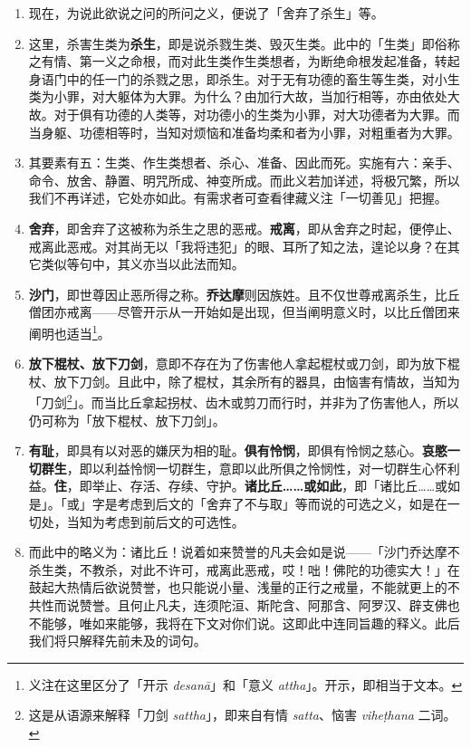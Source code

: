 \begin{enumerate}\item 现在，为说此欲说之问的所问之义，便说了「舍弃了杀生」等。
\item 这里，杀害生类为\textbf{杀生}，即是说杀戮生类、毁灭生类。此中的「生类」即俗称之有情、第一义之命根，而对此生类作生类想者，为断绝命根发起准备，转起身语门中的任一门的杀戮之思，即杀生。对于无有功德的畜生等生类，对小生类为小罪，对大躯体为大罪。为什么？由加行大故，当加行相等，亦由依处大故。对于俱有功德的人类等，对功德小的生类为小罪，对大功德者为大罪。而当身躯、功德相等时，当知对烦恼和准备均柔和者为小罪，对粗重者为大罪。
\item 其要素有五：生类、作生类想者、杀心、准备、因此而死。实施有六：亲手、命令、放舍、静置、明咒所成、神变所成。而此义若加详述，将极冗繁，所以我们不再详述，它处亦如此。有需求者可查看律藏义注「一切善见」把握。
\item \textbf{舍弃}，即舍弃了这被称为杀生之思的恶戒。\textbf{戒离}，即从舍弃之时起，便停止、戒离此恶戒。对其尚无以「我将违犯」的眼、耳所了知之法，遑论以身？在其它类似等句中，其义亦当以此法而知。
\item \textbf{沙门}，即世尊因止恶所得之称。\textbf{乔达摩}则因族姓。且不仅世尊戒离杀生，比丘僧团亦戒离——尽管开示从一开始如是出现，但当阐明意义时，以比丘僧团来阐明也适当\footnote{义注在这里区分了「开示 \textit{desanā}」和「意义 \textit{attha}」。开示，即相当于文本。}。
\item \textbf{放下棍杖、放下刀剑}，意即不存在为了伤害他人拿起棍杖或刀剑，即为放下棍杖、放下刀剑。且此中，除了棍杖，其余所有的器具，由恼害有情故，当知为「刀剑\footnote{这是从语源来解释「刀剑 \textit{sattha}」，即来自有情 \textit{satta}、恼害 \textit{viheṭhana} 二词。}」。而当比丘拿起拐杖、齿木或剪刀而行时，并非为了伤害他人，所以仍可称为「放下棍杖、放下刀剑」。
\item \textbf{有耻}，即具有以对恶的嫌厌为相的耻。\textbf{俱有怜悯}，即俱有怜悯之慈心。\textbf{哀愍一切群生}，即以利益怜悯一切群生，意即以此所俱之怜悯性，对一切群生心怀利益。\textbf{住}，即举止、存活、存续、守护。\textbf{诸比丘……或如此}，即「诸比丘……或如是」。「或」字是考虑到后文的「舍弃了不与取」等而说的可选之义，如是在一切处，当知为考虑到前后文的可选性。
\item 而此中的略义为：诸比丘！说着如来赞誉的凡夫会如是说——「沙门乔达摩不杀生类，不教杀，对此不许可，戒离此恶戒，哎！咄！佛陀的功德实大！」在鼓起大热情后欲说赞誉，也只能说小量、浅量的正行之戒量，不能就更上的不共性而说赞誉。且何止凡夫，连须陀洹、斯陀含、阿那含、阿罗汉、辟支佛也不能够，唯如来能够，我将在下文对你们说。这即此中连同旨趣的释义。此后我们将只解释先前未及的词句。

\end{enumerate}
